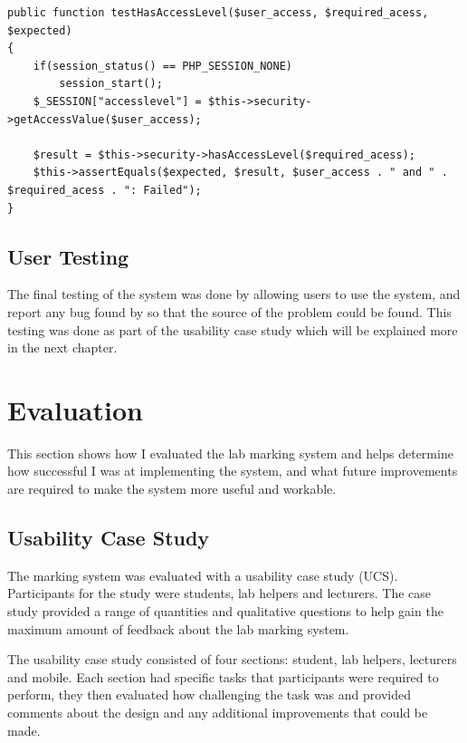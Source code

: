 \documentclass[11pt]{report}
\begin{document}
\singlespacing
\begin{lstlisting}[caption= hasAccessLevel Function Test, label = lst:hasAccess-test]
public function testHasAccessLevel($user_access, $required_acess, $expected)
{
    if(session_status() == PHP_SESSION_NONE)
        session_start();
    $_SESSION["accesslevel"] = $this->security->getAccessValue($user_access);

    $result = $this->security->hasAccessLevel($required_acess);
    $this->assertEquals($expected, $result, $user_access . " and " . $required_acess . ": Failed");
}
\end{lstlisting}
\doublespacing



\section{User Testing}

The final testing of the system was done by allowing users to use the system, and report any bug found by so that the source of the problem could be found. This testing was done as part of the usability case study which will be explained more in the next chapter. 




\newpage
\chapter{Evaluation}

This section shows how I evaluated the lab marking system and helps determine how successful I was at implementing the system, and what future improvements are required to make the system more useful and workable. 

\section{Usability Case Study}
The marking system was evaluated with a usability case study (UCS). Participants for the study were students, lab helpers and lecturers. The case study provided a range of quantities and qualitative questions to help gain the maximum amount of feedback about the lab marking system. 


The usability case study consisted of four sections: student, lab helpers, lecturers and mobile. Each section had specific tasks that participants were required to perform, they then evaluated how challenging the task was and provided comments about the design and any additional improvements that could be made. 
\end{document}
